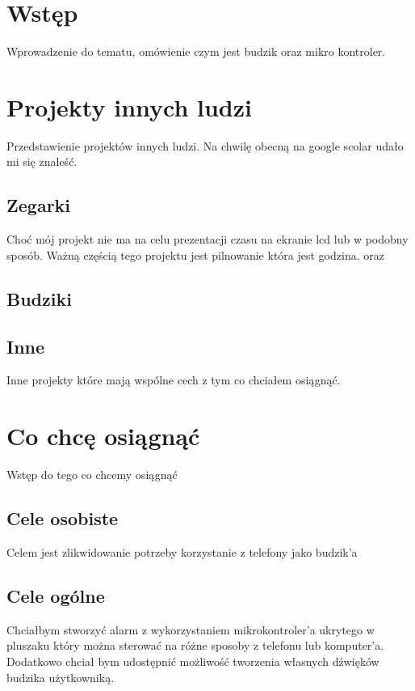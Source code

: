 \documentclass[a4paper,12pt,oneside,onecolumn]{book}
\begin{document}

\chapter*{Wstęp}
Wprowadzenie do tematu, omówienie czym jest budzik oraz mikro kontroler.
\chapter{Projekty innych ludzi}
Przedstawienie projektów innych ludzi.
Na chwilę obecną na google scolar udało mi się znaleść.
\section{Zegarki}
Choć mój projekt nie ma na celu prezentacji czasu na ekranie lcd lub w podobny sposób.
Ważną częścią tego projektu jest pilnowanie która jest godzina.
\newline\newline
\parencite{lukman2016development} oraz \parencite{khan2012designing}
\section{Budziki}
\parencite{screws470digital}
\section{Inne}
Inne projekty które mają wspólne cech z tym co chciałem osiągnąć.

\chapter{Co chcę osiągnąć}
Wstęp do tego co chcemy osiągnąć
\section{Cele osobiste}
Celem jest zlikwidowanie potrzeby korzystanie z telefony jako budzik'a
\section{Cele ogólne}
Chciałbym stworzyć alarm z wykorzystaniem mikrokontroler'a ukrytego w pluszaku który można sterować na różne sposoby z telefonu lub komputer'a.
Dodatkowo chciał bym udostępnić możliwość tworzenia własnych dźwięków budzika użytkowniką.
\end{document}
